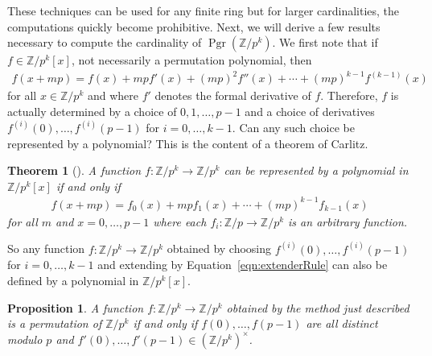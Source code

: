 \documentclass[oneside]{amsart}
\theoremstyle{nthm}
\newtheorem{thm2}[subsection]{Theorem}
\newtheorem{prop}[subsection]{Proposition}
\theoremstyle{ndef}
\theoremstyle{nrem}
\newcommand{\Z}{\mathbb{Z}}
\DeclareMathOperator{\Pgr}{Pgr}
\begin{document}
These techniques can be used for any finite ring but for larger cardinalities, the computations quickly become prohibitive. Next, we will derive a few results necessary to compute the cardinality of $\Pgr(\Z/p^k)$. We first note that if $f\in \Z/p^k[x]$, not necessarily a permutation polynomial, then
\begin{align}\label{eqn:extenderRule}
    f(x + mp) = f(x) + mpf'(x) + (mp)^2f''(x) + \cdots + (mp)^{k-1}f^{(k-1)}(x)
\end{align}
for all $x\in \Z/p^k$ and where $f'$ denotes the formal derivative of $f$. Therefore, $f$ is actually determined by a choice of $0,1,\dots,p-1$ and a choice of derivatives $f^{(i)}(0),\dots,f^{(i)}(p-1)$ for $i=0,\dots,k-1$. Can any such choice be represented by a polynomial? This is the content of a theorem of Carlitz.
\begin{thm2}[{\cite[Theorem 3]{Carlitz1964}}]
    A function $f:\Z/p^k\to\Z/p^k$ can be represented by a polynomial in $\Z/p^k[x]$ if and only if
    \begin{align*}
        f(x + mp) = f_0(x) + mpf_1(x) + \cdots + (mp)^{k-1}f_{k-1}(x)
    \end{align*}
    for all $m$ and $x = 0,\dots,p-1$ where each $f_i:\Z/p\to \Z/p^k$ is an arbitrary function.
\end{thm2}
So any function $f:\Z/p^k\to\Z/p^k$ obtained by choosing $f^{(i)}(0),\dots,f^{(i)}(p-1)$ for $i = 0,\dots,k-1$ and extending by Equation~\eqref{eqn:extenderRule} can also be defined by a polynomial in $\Z/p^k[x]$.
\begin{prop}
    A function $f:\Z/p^k\to\Z/p^k$ obtained by the method just described is a permutation of $\Z/p^k$ if and only if $f(0),\dots,f(p-1)$ are all distinct modulo $p$ and $f'(0),\dots,f'(p-1)\in (\Z/p^k)^\times$.
\end{prop}
\end{document}
